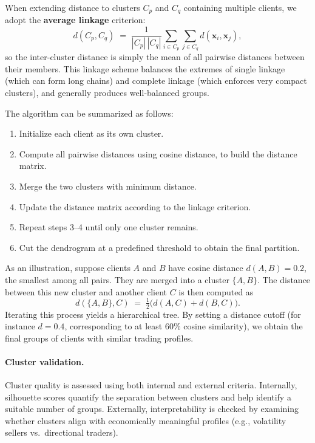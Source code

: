 \documentclass[12pt,a4paper]{report}
\begin{document}
When extending distance to clusters $C_p$ and $C_q$ containing multiple clients, we adopt the \textbf{average linkage} criterion:  
\[
    d(C_p, C_q) \;=\; \frac{1}{|C_p|\,|C_q|} \sum_{i \in C_p} \sum_{j \in C_q} d(\mathbf{x}_i, \mathbf{x}_j),
\]  
so the inter-cluster distance is simply the mean of all pairwise distances between their members. This linkage scheme balances the extremes of single linkage (which can form long chains) and complete linkage (which enforces very compact clusters), and generally produces well-balanced groups.  

The algorithm can be summarized as follows:  
\begin{enumerate}
    \item Initialize each client as its own cluster.  
    \item Compute all pairwise distances using cosine distance, to build the distance matrix.  
    \item Merge the two clusters with minimum distance.  
    \item Update the distance matrix according to the linkage criterion.  
    \item Repeat steps 3--4 until only one cluster remains.  
    \item Cut the dendrogram at a predefined threshold to obtain the final partition.  
\end{enumerate}

As an illustration, suppose clients $A$ and $B$ have cosine distance $d(A,B) = 0.2$, the smallest among all pairs. They are merged into a cluster $\{A,B\}$. The distance between this new cluster and another client $C$ is then computed as  
\[
    d(\{A,B\}, C) \;=\; \tfrac{1}{2}\big(d(A,C) + d(B,C)\big).
\]  
Iterating this process yields a hierarchical tree. By setting a distance cutoff (for instance $d=0.4$, corresponding to at least $60\%$ cosine similarity), we obtain the final groups of clients with similar trading profiles.

\paragraph{Cluster validation.}
Cluster quality is assessed using both internal and external criteria. Internally, silhouette scores quantify the separation between clusters and help identify a suitable number of groups. Externally, interpretability is checked by examining whether clusters align with economically meaningful profiles (e.g., volatility sellers vs.\ directional traders).  
\end{document}
